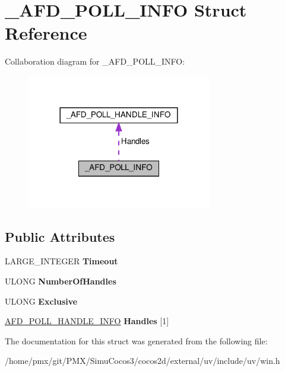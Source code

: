 \hypertarget{struct__AFD__POLL__INFO}{}\section{\+\_\+\+A\+F\+D\+\_\+\+P\+O\+L\+L\+\_\+\+I\+N\+FO Struct Reference}
\label{struct__AFD__POLL__INFO}


Collaboration diagram for \+\_\+\+A\+F\+D\+\_\+\+P\+O\+L\+L\+\_\+\+I\+N\+FO\+:
\nopagebreak
\begin{figure}[H]
\begin{center}
\leavevmode
\includegraphics[width=228pt]{struct__AFD__POLL__INFO__coll__graph}
\end{center}
\end{figure}
\subsection*{Public Attributes}
\begin{DoxyCompactItemize}
\item 
\mbox{\label{struct__AFD__POLL__INFO_a0504993706eef7ab023467030519adb9}} 
L\+A\+R\+G\+E\+\_\+\+I\+N\+T\+E\+G\+ER {\bfseries Timeout}
\item 
\mbox{\label{struct__AFD__POLL__INFO_ac37001d47d932e44224b70ffe7233d30}} 
U\+L\+O\+NG {\bfseries Number\+Of\+Handles}
\item 
\mbox{\label{struct__AFD__POLL__INFO_acc55cd6176cbd088afa107ec38573cc1}} 
U\+L\+O\+NG {\bfseries Exclusive}
\item 
\mbox{\label{struct__AFD__POLL__INFO_ae72b9c1736ba89ccfbcffda40588c67d}} 
\hyperlink{struct__AFD__POLL__HANDLE__INFO}{A\+F\+D\+\_\+\+P\+O\+L\+L\+\_\+\+H\+A\+N\+D\+L\+E\+\_\+\+I\+N\+FO} {\bfseries Handles} \mbox{[}1\mbox{]}
\end{DoxyCompactItemize}


The documentation for this struct was generated from the following file\+:\begin{DoxyCompactItemize}
\item 
/home/pmx/git/\+P\+M\+X/\+Simu\+Cocos3/cocos2d/external/uv/include/uv/win.\+h\end{DoxyCompactItemize}
